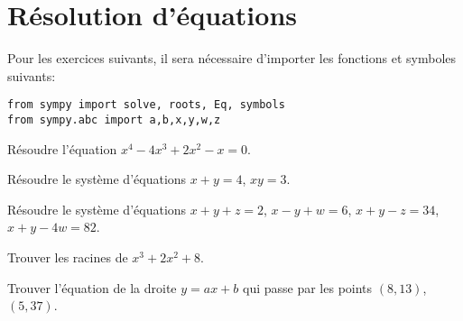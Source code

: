 
\section{Résolution d'équations}

Pour les exercices suivants, il sera nécessaire d'importer les fonctions
et symboles suivants:
\begin{verbatim}
from sympy import solve, roots, Eq, symbols
from sympy.abc import a,b,x,y,w,z
\end{verbatim}

\begin{exercice}
    Résoudre l'équation $x^4-4x^3+2x^2-x=0$.
\end{exercice}

\begin{exercice}
    Résoudre le système d'équations $x+y=4$, $xy=3$.
\end{exercice}

\begin{exercice}
Résoudre le système d'équations $x+y+z=2$, $x-y+w=6$, $x+y-z=34$, $x+y-4w=82$.
\end{exercice}

\begin{exercice}
    Trouver les racines de $x^3 + 2x^2 + 8$.
\end{exercice}

\begin{exercice}
Trouver l'équation de la droite $y=ax+b$ qui passe par les points
$(8,13)$, $(5,37)$.
\end{exercice}


